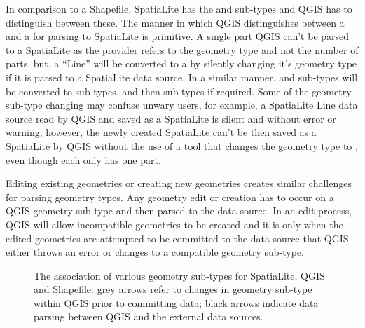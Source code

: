\documentclass[a4paper,11pt,english]{sphinxmanual}
\begin{document}
In comparison to a Shapefile, SpatiaLite has the  and  sub-types and QGIS has to distinguish between these.  The manner in which QGIS distinguishes between a  and a  for parsing to SpatiaLite is primitive.  A single part QGIS  can’t be parsed to a SpatiaLite  as the provider refers to the geometry type and not the number of parts, but, a “Line” will be converted to a  by silently changing it’s geometry type if it is parsed to a SpatiaLite  data source. In a similar manner,  and  sub-types will be converted to  sub-types, and then  sub-types if required.  Some of the geometry sub-type changing may confuse unwary users, for example, a SpatiaLite Line data source read by QGIS and saved as a SpatiaLite  is silent and without error or warning, however, the newly created SpatiaLite  can’t be then saved as a SpatiaLite  by QGIS without the use of a tool that changes the geometry type to , even though each  only has one part.

Editing existing geometries or creating new geometries creates similar challenges for parsing geometry types.  Any geometry edit or creation has to occur on a QGIS geometry sub-type and then parsed to the data source.  In an edit process, QGIS will allow incompatible geometries to be created and it is only when the edited geometries are attempted to be committed to the data source that QGIS either throws an error or changes to a compatible geometry sub-type.

\begin{figure}[htbp]
\centering
\capstart

\noindent{}
\caption{The association of various geometry  sub-types for SpatiaLite, QGIS and Shapefile: grey arrows refer to changes in geometry sub-type within QGIS prior to committing data; black arrows indicate data parsing between QGIS and the external data sources.}\label{\detokenize{QGISproblems:id21}}\label{\detokenize{QGISproblems:figureshapetoqgis}}\end{figure}
\end{document}
